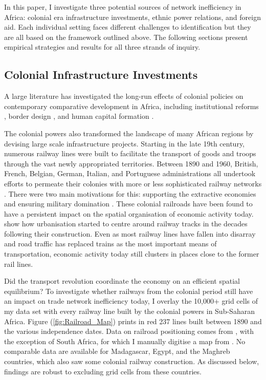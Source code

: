 \documentclass[11pt, oneside]{article}   	%
\let\oldref\ref
\renewcommand{\ref}[1]{(\oldref{#1})}
\begin{document}
In this paper, I investigate three potential sources of network inefficiency in Africa: colonial era infrastructure investments, ethnic power relations, and foreign aid. Each individual setting faces different challenges to identification but they are all based on the framework outlined above. The following sections present empirical strategies and results for all three strands of inquiry.

\subsection{Colonial Infrastructure Investments}
A large literature has investigated the long-run effects of colonial policies on contemporary comparative development in Africa, including institutional reforms \citep{Acemoglu_ColonialOriginsComparative_2001,Acemoglu_ReversalFortuneGeography_2002}, border design \citep{Michalopoulos_LongRunEffectsScramble_2016}, and human capital formation \citep{Wantchekon_EducationHumanCapital_2015}.

The colonial powers also transformed the landscape of many African regions by devising large scale infrastructure projects. Starting in the late 19th century, numerous railway lines were built to facilitate the transport of goods and troops through the vast newly appropriated territories. Between 1890 and 1960, British, French, Belgian, German, Italian, and Portuguese administrations all undertook efforts to permeate their colonies with more or less sophisticated railway networks \citep{Jedwab_PermanentEffectsTransportation_2016a}. There were two main motivations for this: supporting the extractive economies and ensuring military domination \citep{Jedwab_HistoryPathDependence_2017a}. These colonial railroads have been found to have a persistent impact on the spatial organisation of economic activity today. \cite{Jedwab_PermanentEffectsTransportation_2016a} show how urbanisation started to centre around railway tracks in the decades following their construction. Even as most railway lines have fallen into disarray and road traffic has replaced trains as the most important means of transportation, economic activity today still clusters in places close to the former rail lines.

Did the transport revolution coordinate the economy on an efficient spatial equilibrium? To investigate whether railways from the colonial period still have an impact on trade network inefficiency today, I overlay the 10,000+ grid cells of my data set with every railway line built by the colonial powers in Sub-Saharan Africa. Figure \ref{fig:Railroad_Map} prints in red 237 lines built between 1890 and the various independence dates. Data on railroad positioning comes from \cite{Jedwab_PermanentEffectsTransportation_2016a}, with the exception of South Africa, for which I manually digitise a map from \cite{Herranz-Loncan_publicbenefitRailways_2017}. No comparable data are available for Madagascar, Egypt, and the Maghreb countries, which also saw some colonial railway construction. As discussed below, findings are robust to excluding grid cells from these countries.
\end{document}
